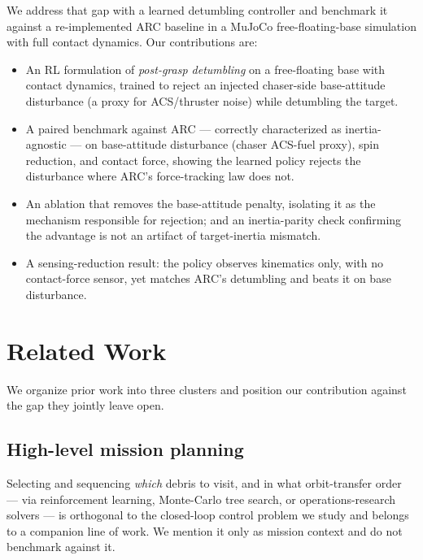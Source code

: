 \documentclass[conference]{IEEEtran}
\begin{document}
We address that gap with a learned detumbling controller and benchmark it against a re-implemented
ARC baseline in a MuJoCo free-floating-base simulation with full contact dynamics. Our
contributions are:
\begin{itemize}
\item An RL formulation of \emph{post-grasp detumbling} on a free-floating base with contact
      dynamics, trained to reject an injected chaser-side base-attitude disturbance (a proxy for
      ACS/thruster noise) while detumbling the target.
\item A paired benchmark against ARC --- correctly characterized as inertia-agnostic --- on
      base-attitude disturbance (chaser ACS-fuel proxy), spin reduction, and contact force, showing
      the learned policy rejects the disturbance where ARC's force-tracking law does not.
\item An ablation that removes the base-attitude penalty, isolating it as the mechanism responsible
      for rejection; and an inertia-parity check confirming the advantage is not an artifact of
      target-inertia mismatch.
\item A sensing-reduction result: the policy observes kinematics only, with no contact-force sensor,
      yet matches ARC's detumbling and beats it on base disturbance.
\end{itemize}

\section{Related Work}
We organize prior work into three clusters and position our contribution against the gap they
jointly leave open.

\subsection{High-level mission planning}
Selecting and sequencing \emph{which} debris to visit, and in what orbit-transfer order --- via
reinforcement learning, Monte-Carlo tree search, or operations-research solvers --- is orthogonal to
the closed-loop control problem we study and belongs to a companion line of work. We mention it only
as mission context and do not benchmark against it.
\end{document}
